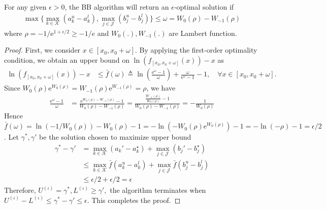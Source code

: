 \documentclass[runningheads]{llncs}
\begin{document}
\begin{lemma}
For any given $\epsilon > 0$, the BB algorithm will return an $\epsilon$-optimal solution if
\begin{align}
\max \{ \max_{k \in \mathcal{K}} (a_{k}^u - a_{k}^l), \max_{j \in \mathcal{J}} (b_{j}^u - b_{j}^l) \} \le \omega = W_0 (\rho) - W_{-1} (\rho)
\end{align}
where $\rho = -1/\mathrm{e}^{1+\epsilon/2} \ge -1/e$ and $W_0(.), W_{-1} (.) $ are Lambert function. 
\end{lemma} 
\begin{proof}
First, we consider $x \in [x_0, x_0 + \omega]$. By applying the first-order optimality condition, we obtain an upper bound on $\ln (f_{[x_0, x_0 + \omega]} (x)) - x$ as
\begin{align}
\ln (f_{[x_0, x_0 + \omega]} (x)) - x 
&\le \bar{f} (\omega) \triangleq  \ln \!\left(\frac{\mathrm{e}^\omega-1}{\omega}\right) + \frac{\omega}{\mathrm{e}^\omega-1} - 1, \quad \forall x \in [x_0, x_0 + \omega ].
\end{align}
Since $W_0 (\rho) \mathrm{e}^{W_0 (\rho)} = W_{-1} (\rho) \mathrm{e}^{W_{-1} (\rho)} = \rho $, we have
\begin{align}
\frac{\mathrm{e}^\omega-1}{\omega} &= \frac{\mathrm{e}^{W_0 (\rho) - W_{-1} (\rho)} -1}{W_0 (\rho) - W_{-1} (\rho)} = \frac{\frac{{W_{-1} (\rho)}}{{W_{0} (\rho)}} - 1}{W_0 (\rho) - W_{-1} (\rho)}  = -\frac{1}{W_0(\rho)}
\end{align}
Hence $ \bar{f} (\omega) = \ln \left(- {1}/{W_0(\rho)} \right) - {W_0(\rho)} -1 = -\ln (- {W_0(\rho)} \mathrm{e}^{{W_0(\rho)}} ) -1 = -\ln (- \rho) -1 = \epsilon/2 $. Let $\gamma^*, \gamma'$ be the solution chosen to maximize upper bound 
\begin{align}
\gamma^* - \gamma' &= \max_{k \in \mathcal{K}} (a_k' - a_k^\star) + \max_{j \in \mathcal{J}} (b_j' - b_j^\star) \\
& \le \max_{k \in \mathcal{K}} \bar{f} ( a_k^u - a_k^l) + \max_{j \in \mathcal{J}} \bar{f} ( b_j^u - b_j^l) \\
& \le \epsilon/2 + \epsilon/2 = \epsilon
\end{align}
Therefore, $U^{(\iota)} = \gamma^*, L^{(\iota)} \ge \gamma',$ the algorithm terminates when $U^{(\iota)} - L^{(\iota)} \le \gamma^* -\gamma' \le \epsilon$. This completes the proof.
\end{proof}
\end{document}
